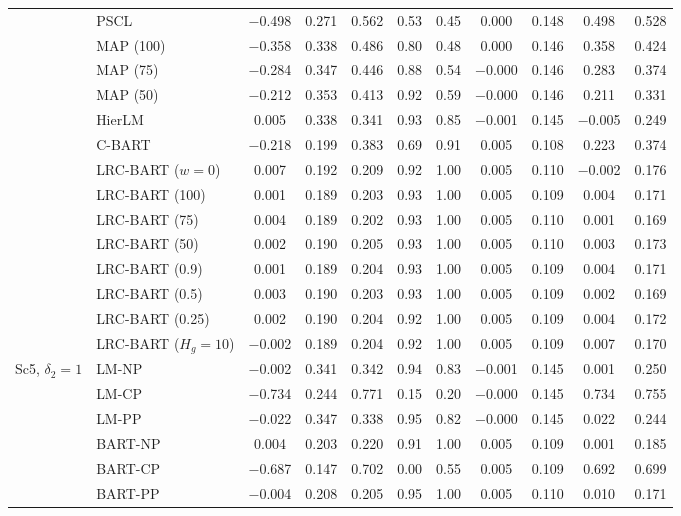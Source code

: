 \documentclass[11pt]{article}
\theoremstyle{definition}
\theoremstyle{plain}
\begin{document}
\begin{center}
\begin{longtable}{llccccccccc}
& PSCL & $-$0.498 & 0.271 & 0.562 & 0.53 & 0.45 & 0.000 & 0.148 & 0.498 & 0.528 \\
& MAP (100) & $-$0.358 & 0.338 & 0.486 & 0.80 & 0.48 & 0.000 & 0.146 & 0.358 & 0.424 \\
& MAP (75) & $-$0.284 & 0.347 & 0.446 & 0.88 & 0.54 & $-$0.000 & 0.146 & 0.283 & 0.374 \\
& MAP (50) & $-$0.212 & 0.353 & 0.413 & 0.92 & 0.59 & $-$0.000 & 0.146 & 0.211 & 0.331 \\
& HierLM & 0.005 & 0.338 & 0.341 & 0.93 & 0.85 & $-$0.001 & 0.145 & $-$0.005 & 0.249 \\
& C-BART & $-$0.218 & 0.199 & 0.383 & 0.69 & 0.91 & 0.005 & 0.108 & 0.223 & 0.374 \\
& LRC-BART ($w=0$) & 0.007 & 0.192 & 0.209 & 0.92 & 1.00 & 0.005 & 0.110 & $-$0.002 & 0.176 \\
& LRC-BART (100) & 0.001 & 0.189 & 0.203 & 0.93 & 1.00 & 0.005 & 0.109 & 0.004 & 0.171 \\
& LRC-BART (75) & 0.004 & 0.189 & 0.202 & 0.93 & 1.00 & 0.005 & 0.110 & 0.001 & 0.169 \\
& LRC-BART (50) & 0.002 & 0.190 & 0.205 & 0.93 & 1.00 & 0.005 & 0.110 & 0.003 & 0.173 \\
& LRC-BART (0.9) & 0.001 & 0.189 & 0.204 & 0.93 & 1.00 & 0.005 & 0.109 & 0.004 & 0.171 \\
& LRC-BART (0.5) & 0.003 & 0.190 & 0.203 & 0.93 & 1.00 & 0.005 & 0.109 & 0.002 & 0.169 \\
& LRC-BART (0.25) & 0.002 & 0.190 & 0.204 & 0.92 & 1.00 & 0.005 & 0.109 & 0.004 & 0.172 \\
& LRC-BART ($H_g=10$) & $-$0.002 & 0.189 & 0.204 & 0.92 & 1.00 & 0.005 & 0.109 & 0.007 & 0.170 \\
\midrule
\multirow{20}{*}{Sc5, $\delta_2=1$} & LM-NP & $-$0.002 & 0.341 & 0.342 & 0.94 & 0.83 & $-$0.001 & 0.145 & 0.001 & 0.250 \\
& LM-CP & $-$0.734 & 0.244 & 0.771 & 0.15 & 0.20 & $-$0.000 & 0.145 & 0.734 & 0.755 \\
& LM-PP & $-$0.022 & 0.347 & 0.338 & 0.95 & 0.82 & $-$0.000 & 0.145 & 0.022 & 0.244 \\
& BART-NP & 0.004 & 0.203 & 0.220 & 0.91 & 1.00 & 0.005 & 0.109 & 0.001 & 0.185 \\
& BART-CP & $-$0.687 & 0.147 & 0.702 & 0.00 & 0.55 & 0.005 & 0.109 & 0.692 & 0.699 \\
& BART-PP & $-$0.004 & 0.208 & 0.205 & 0.95 & 1.00 & 0.005 & 0.110 & 0.010 & 0.171 \\

\end{longtable}
\end{center}
\end{document}
